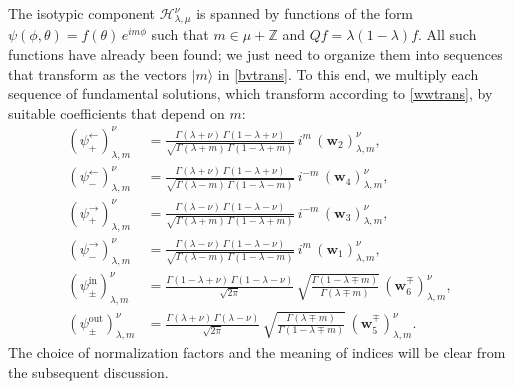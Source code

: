 \documentclass[11pt]{article}
\newcommand{\lt}{\left}
\newcommand{\rt}{\right}
\newcommand*{\ket}[1]{|{#1}\rangle}
\newcommand{\calH}{\mathcal{H}}
\newcommand{\ZZ}{\mathbb{Z}}
\newcommand{\lar}{{\leftarrow}}
\newcommand{\rar}{{\rightarrow}}
\newcommand{\IN}{\text{in}}
\newcommand{\OUT}{\text{out}}
\newcommand{\ww}{\mathbf{w}}
\newcommand{\lam}{\lambda}
\begin{document}
The isotypic component $\calH^{\nu}_{\lambda,\mu}$ is spanned by functions of the form $\psi(\phi,\theta)=f(\theta)\,e^{im\phi}$ such that $m\in\mu+\ZZ$ and $Qf=\lambda(1-\lambda)f$. All such functions have already been found; we just need to organize them into sequences that transform as the vectors $\ket{m}$ in \eqref{bvtrans}. To this end, we multiply each sequence of fundamental solutions, which transform according to \eqref{wwtrans}, by suitable coefficients that depend on $m$:
\begin{equation}\label{normfs}
\begin{aligned}
\lt( \psi^{\lar}_{+} \rt)^{\nu}_{\lambda,m}&=
\frac{\Gamma(\lambda+\nu)\,\Gamma(1-\lambda+\nu)}
{\sqrt{\Gamma(\lambda+m)\,\Gamma(1-\lambda+m)}}\,i^{m}\,\lt(\ww_{2}\rt)_{\lam,m}^{\nu},
\\[3pt]
\lt( \psi^{\lar}_{-} \rt)^{\nu}_{\lambda,m}&=
\frac{\Gamma(\lambda+\nu)\,\Gamma(1-\lambda+\nu)}
{\sqrt{\Gamma(\lambda-m)\,\Gamma(1-\lambda-m)}}\,i^{-m}\,\lt(\ww_{4}\rt)_{\lam,m}^{\nu},
\\[3pt]
\lt( \psi^{\rar}_{+} \rt)^{\nu}_{\lambda,m}&=
\frac{\Gamma(\lambda-\nu)\,\Gamma(1-\lambda-\nu)}
{\sqrt{\Gamma(\lambda+m)\,\Gamma(1-\lambda+m)}}\,i^{-m}\,\lt(\ww_{3}\rt)_{\lam,m}^{\nu},
\\[3pt]
\lt( \psi^{\rar}_{-} \rt)^{\nu}_{\lambda,m}&=
\frac{\Gamma(\lambda-\nu)\,\Gamma(1-\lambda-\nu)}
{\sqrt{\Gamma(\lambda-m)\,\Gamma(1-\lambda-m)}}\,i^{m}\,\lt(\ww_{1}\rt)_{\lam,m}^{\nu},
\\[3pt]
\lt( \psi^{\IN}_{\pm} \rt)^{\nu}_{\lambda,m}&=
\frac{\Gamma(1-\lambda+\nu)\,\Gamma(1-\lambda-\nu)}{\sqrt{2\pi}}\,
\sqrt{\frac{\Gamma(1-\lambda\mp m)}{\Gamma(\lambda\mp m)}}\,\lt(\ww^{\mp}_{6}\rt)_{\lam, m}^{\nu},
\\[3pt]
\lt( \psi^{\OUT}_{\pm} \rt)^{\nu}_{\lambda,m}&=
\frac{\Gamma(\lambda+\nu)\,\Gamma(\lambda-\nu)}{\sqrt{2\pi}}\,
\sqrt{\frac{\Gamma(\lambda\mp m)}{\Gamma(1-\lambda\mp m)}}\,\lt(\ww^{\mp}_{5}\rt)_{\lam,m}^{\nu}.
\end{aligned}
\end{equation}
The choice of normalization factors and the meaning of indices will be clear from the subsequent discussion.
\end{document}
